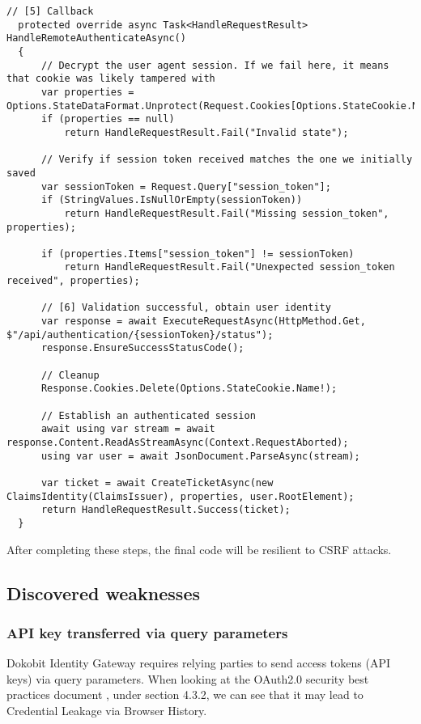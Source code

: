\begin{lstlisting}[caption={Handling access token creation}, label={lst:dokobit-handleremote}]
  // [5] Callback
  protected override async Task<HandleRequestResult> HandleRemoteAuthenticateAsync()
  {
      // Decrypt the user agent session. If we fail here, it means that cookie was likely tampered with
      var properties = Options.StateDataFormat.Unprotect(Request.Cookies[Options.StateCookie.Name!]);
      if (properties == null)
          return HandleRequestResult.Fail("Invalid state");
  
      // Verify if session token received matches the one we initially saved
      var sessionToken = Request.Query["session_token"];
      if (StringValues.IsNullOrEmpty(sessionToken))
          return HandleRequestResult.Fail("Missing session_token", properties);
  
      if (properties.Items["session_token"] != sessionToken)
          return HandleRequestResult.Fail("Unexpected session_token received", properties);
  
      // [6] Validation successful, obtain user identity
      var response = await ExecuteRequestAsync(HttpMethod.Get, $"/api/authentication/{sessionToken}/status");
      response.EnsureSuccessStatusCode();
  
      // Cleanup
      Response.Cookies.Delete(Options.StateCookie.Name!);
  
      // Establish an authenticated session
      await using var stream = await response.Content.ReadAsStreamAsync(Context.RequestAborted);
      using var user = await JsonDocument.ParseAsync(stream);
  
      var ticket = await CreateTicketAsync(new ClaimsIdentity(ClaimsIssuer), properties, user.RootElement);
      return HandleRequestResult.Success(ticket);
  }
\end{lstlisting}

After completing these steps, the final code will be resilient to CSRF attacks.

\subsection{Discovered weaknesses}

\subsubsection{API key transferred via query parameters}

Dokobit Identity Gateway requires {relying parties} to send access tokens (API keys) via query parameters. When looking at the OAuth2.0 security best practices document \cite{ietf-oauth-security-topics-19}, under section 4.3.2, we can see that it may lead to Credential Leakage via Browser History.

